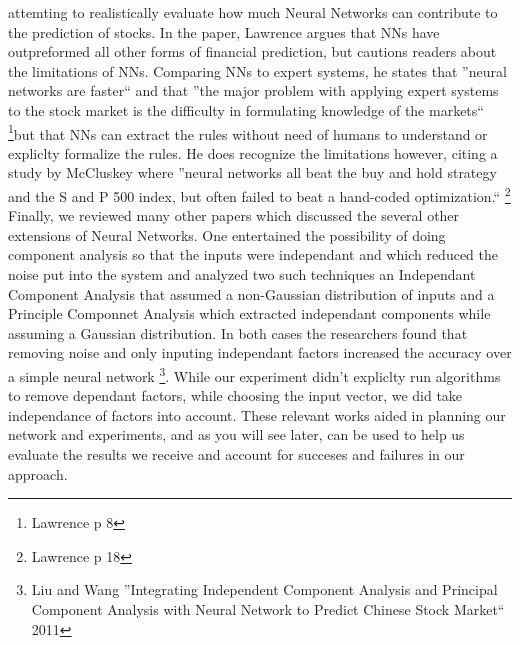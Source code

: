 \documentclass[a4paper,11pt]{article}
\begin{document}
attemting to realistically evaluate how much Neural Networks can contribute to the prediction of stocks. In
the paper, Lawrence argues that NNs have outpreformed all other forms of financial prediction, but cautions
readers about the limitations of NNs. Comparing NNs to expert systems, he states that ''neural networks are
faster`` and that ''the major problem with applying expert systems to the stock market is the difficulty in
formulating knowledge of the markets`` \footnote{Lawrence p 8}but that NNs can extract the rules without need of humans to
understand or expliclty formalize the rules. He does recognize the limitations however, citing a study by
McCluskey where ''neural networks all beat the buy and hold strategy and the S and P 500 index, but often
failed to beat a hand-coded optimization.`` \footnote{Lawrence p 18}
Finally, we reviewed many other papers which discussed the several other extensions of Neural Networks. One entertained the possibility of doing component analysis so that the inputs were independant and which reduced the noise put into the system and analyzed two such techniques an Independant Component Analysis that assumed a non-Gaussian distribution of inputs and a Principle Componnet Analysis which extracted independant components while assuming a Gaussian distribution. In both cases the researchers found that removing noise and only inputing independant factors increased the accuracy over a simple neural network \footnote{Liu and Wang ''Integrating Independent Component Analysis and Principal Component Analysis with Neural Network to Predict Chinese Stock Market`` 2011}. While our experiment didn't expliclty run algorithms to remove dependant factors, while choosing the input vector, we did take independance of factors into account. 
These relevant works aided in planning our network and experiments, and as you will see later, can be used to help us evaluate the results we receive and account for succeses and failures in our approach. 
\end{document}
